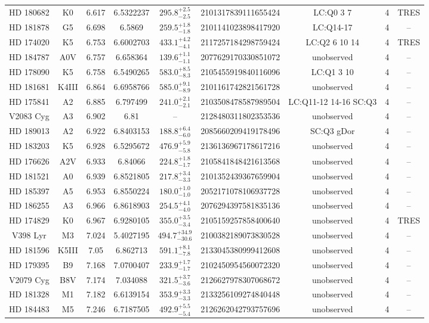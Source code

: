 \begin{table*}
\begin{tabular}{ccccccccc}
HD 180682 & K0 & 6.617 & 6.5322237 & $295.8^{+2.5}_{-2.5}$ & 2101317839111655424 & LC:Q0 3 7 & 4 & TRES \\
HD 181878 & G5 & 6.698 & 6.5869 & $259.5^{+1.8}_{-1.8}$ & 2101141023898417920 & LC:Q14-17 & 4 & -- \\
HD 174020 & K5 & 6.753 & 6.6002703 & $433.1^{+4.2}_{-4.1}$ & 2117257184298759424 & LC:Q2 6 10 14 & 4 & TRES \\
HD 184787 & A0V & 6.757 & 6.658364 & $139.6^{+1.1}_{-1.1}$ & 2077629170330851072 & unobserved & 4 & -- \\
HD 178090 & K5 & 6.758 & 6.5490265 & $583.0^{+8.5}_{-8.3}$ & 2105455919840116096 & LC:Q1 3 10 & 4 & -- \\
HD 181681 & K4III & 6.864 & 6.6958766 & $585.0^{+9.1}_{-8.9}$ & 2101161742821561728 & unobserved & 4 & -- \\
HD 175841 & A2 & 6.885 & 6.797499 & $241.0^{+2.1}_{-2.1}$ & 2103508478587989504 & LC:Q11-12 14-16 SC:Q3 & 4 & -- \\
V2083 Cyg & A3 & 6.902 & 6.81 & -- & 2128480311802353536 & unobserved & 4 & -- \\
HD 189013 & A2 & 6.922 & 6.8403153 & $188.8^{+6.4}_{-6.0}$ & 2085660209419178496 & SC:Q3 gDor & 4 & -- \\
HD 183203 & K5 & 6.928 & 6.5295672 & $476.9^{+5.9}_{-5.8}$ & 2136136967178617216 & unobserved & 4 & -- \\
HD 176626 & A2V & 6.933 & 6.84066 & $224.8^{+1.8}_{-1.7}$ & 2105841848421613568 & unobserved & 4 & -- \\
HD 181521 & A0 & 6.939 & 6.8521805 & $217.8^{+3.4}_{-3.3}$ & 2101352439367659904 & unobserved & 4 & -- \\
HD 185397 & A5 & 6.953 & 6.8550224 & $180.0^{+1.0}_{-1.0}$ & 2052171078106937728 & unobserved & 4 & -- \\
HD 186255 & A3 & 6.966 & 6.8618903 & $254.5^{+4.1}_{-4.0}$ & 2076294397581835136 & unobserved & 4 & -- \\
HD 174829 & K0 & 6.967 & 6.9280105 & $355.0^{+3.5}_{-3.4}$ & 2105159257858400640 & unobserved & 4 & TRES \\
V398 Lyr & M3 & 7.024 & 5.4027195 & $494.7^{+34.9}_{-30.6}$ & 2100382189073830528 & unobserved & 4 & -- \\
HD 181596 & K5III & 7.05 & 6.862713 & $591.1^{+8.1}_{-7.8}$ & 2133045380999412608 & unobserved & 4 & -- \\
HD 179395 & B9 & 7.168 & 7.0700407 & $233.9^{+1.7}_{-1.7}$ & 2102450954560072320 & unobserved & 4 & -- \\
V2079 Cyg & B8V & 7.174 & 7.034088 & $321.5^{+3.7}_{-3.6}$ & 2126627978307068672 & unobserved & 4 & -- \\
HD 181328 & M1 & 7.182 & 6.6139154 & $353.9^{+3.3}_{-3.3}$ & 2133256109274840448 & unobserved & 4 & -- \\
HD 184483 & M5 & 7.246 & 6.7187505 & $492.9^{+5.5}_{-5.4}$ & 2126262042793757696 & unobserved & 4 & -- \\
\hline
\end{tabular}
\end{table*}
